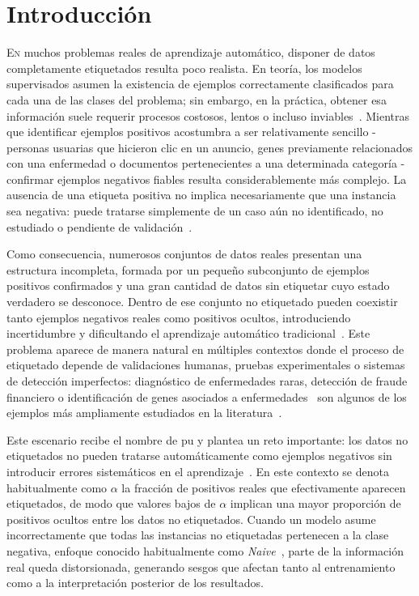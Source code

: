 \chapter{Introducción}
\label{chap:introducion}

\lettrine{E}{n} muchos problemas reales de aprendizaje automático, disponer de datos completamente etiquetados resulta poco realista. En teoría, los modelos supervisados asumen la existencia de ejemplos correctamente clasificados para cada una de las clases del problema; sin embargo, en la práctica, obtener esa información suele requerir procesos costosos, lentos o incluso inviables~\cite{bekker2020learning}. Mientras que identificar ejemplos positivos acostumbra a ser relativamente sencillo - personas usuarias que hicieron clic en un anuncio, genes previamente relacionados con una enfermedad o documentos pertenecientes a una determinada categoría - confirmar ejemplos negativos fiables resulta considerablemente más complejo. La ausencia de una etiqueta positiva no implica necesariamente que una instancia sea negativa: puede tratarse simplemente de un caso aún no identificado, no estudiado o pendiente de validación~\cite{bekker2020learning}.

Como consecuencia, numerosos conjuntos de datos reales presentan una estructura incompleta, formada por un pequeño subconjunto de ejemplos positivos confirmados y una gran cantidad de datos sin etiquetar cuyo estado verdadero se desconoce.
Dentro de ese conjunto no etiquetado pueden coexistir tanto ejemplos negativos reales como positivos ocultos, introduciendo incertidumbre y dificultando el aprendizaje automático tradicional~\cite{bekker2020learning}. Este problema aparece de manera natural en múltiples contextos donde el proceso de etiquetado depende de validaciones humanas, pruebas experimentales o sistemas de detección imperfectos: diagnóstico de enfermedades raras, detección de fraude financiero o identificación de genes asociados a enfermedades~\cite{mordelet2014bagging} son algunos de los ejemplos más ampliamente estudiados en la literatura~\cite{bekker2020learning}.

Este escenario recibe el nombre de \acrfull{pu} y plantea un reto importante: los datos no etiquetados no pueden tratarse automáticamente como ejemplos negativos sin introducir errores sistemáticos en el aprendizaje~\cite{elkan2008learning}. En este contexto se denota habitualmente como $\alpha$ la fracción de positivos reales que efectivamente aparecen etiquetados, de modo que valores bajos de $\alpha$ implican una mayor proporción de positivos ocultos entre los datos no etiquetados. Cuando un modelo asume incorrectamente que todas las instancias no etiquetadas pertenecen a la clase negativa, enfoque conocido habitualmente como \textit{Naive}~\cite{furmanczyk2023double, ward2009presence}, parte de la información real queda distorsionada, generando sesgos que afectan tanto al entrenamiento como a la interpretación posterior de los resultados.

